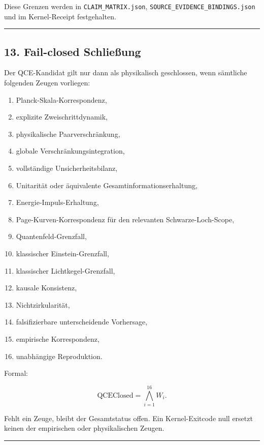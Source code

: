 \documentclass[
  11pt,
  a4paper,
]{article}
\providecommand{\tightlist}{%
  \setlength{\itemsep}{0pt}\setlength{\parskip}{0pt}}
\begin{document}
Diese Grenzen werden in \texttt{CLAIM\_MATRIX.json},
\texttt{SOURCE\_EVIDENCE\_BINDINGS.json} und im Kernel-Receipt
festgehalten.

\begin{center}\rule{0.5\linewidth}{0.5pt}\end{center}

\subsection{13. Fail-closed Schließung}\label{fail-closed-schlieuxdfung}

Der QCE-Kandidat gilt nur dann als physikalisch geschlossen, wenn
sämtliche folgenden Zeugen vorliegen:

\begin{enumerate}
\def\labelenumi{\arabic{enumi}.}
\tightlist
\item
  Planck-Skala-Korrespondenz,
\item
  explizite Zweischrittdynamik,
\item
  physikalische Paarverschränkung,
\item
  globale Verschränkungsintegration,
\item
  vollständige Unsicherheitsbilanz,
\item
  Unitarität oder äquivalente Gesamtinformationserhaltung,
\item
  Energie-Impuls-Erhaltung,
\item
  Page-Kurven-Korrespondenz für den relevanten Schwarze-Loch-Scope,
\item
  Quantenfeld-Grenzfall,
\item
  klassischer Einstein-Grenzfall,
\item
  klassischer Lichtkegel-Grenzfall,
\item
  kausale Konsistenz,
\item
  Nichtzirkularität,
\item
  falsifizierbare unterscheidende Vorhersage,
\item
  empirische Korrespondenz,
\item
  unabhängige Reproduktion.
\end{enumerate}

Formal:

\[
\mathrm{QCEClosed}
=
\bigwedge_{i=1}^{16} W_i.
\]

Fehlt ein Zeuge, bleibt der Gesamtstatus offen. Ein Kernel-Exitcode null
ersetzt keinen der empirischen oder physikalischen Zeugen.

\begin{center}\rule{0.5\linewidth}{0.5pt}\end{center}
\end{document}
